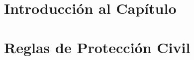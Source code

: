 \section{Introducción al Capítulo}

\section{Reglas de Protección Civil}
%
%















%
%
%
%
%

	
	


